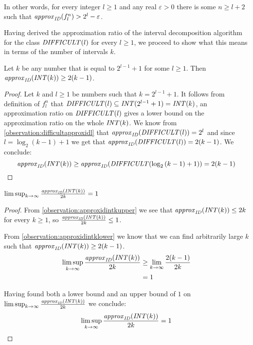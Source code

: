 In other words,
for every integer $l \geq 1$
and any real $\varepsilon > 0$
there is some $n \geq l+2$
such that $\mathit{approx}_{\mathit{ID}} (f_l^n) > 2^l - \varepsilon$.

Having derived the approximation ratio
of the interval decomposition algorithm
for the class $\mathit{DIFFICULT} (l)$ for every $l \geq 1$,
we proceed to show what this means in terms of
the number of intervals $k$.

\begin{observation}
\label{observation:approxidintklower}
Let $k$ be any number that is equal to $2^{l-1} + 1$
for some $l \geq 1$.
Then $\mathit{approx}_{\mathit{ID}} (\mathit{INT} (k)) \geq 2(k-1)$.
\end{observation}

\begin{proof}
Let $k$ and $l \geq 1$ be numbers
such that $k = 2^{l-1} + 1$.
It follows from definition of $f^n_l$ that
$\mathit{DIFFICULT} (l) \subseteq \mathit{INT} (2^{l-1}+1)
= \mathit{INT} (k)$,
an approximation ratio on $\mathit{DIFFICULT} (l)$
gives a lower bound on the approximation ratio
on the whole $\mathit{INT} (k)$.
We know from \cref{observation:difficultapproxidl} that
$\mathit{approx}_{\mathit{ID}} (\mathit{DIFFICULT} (l)) = 2^l$
and since $l = \log_2{(k-1)} + 1$ we get that
$\mathit{approx}_{\mathit{ID}} (\mathit{DIFFICULT} (l)) = 2(k-1)$.
We conclude:
$$
\mathit{approx}_{\mathit{ID}} (\mathit{INT} (k))
\geq \mathit{approx}_{\mathit{ID}} (\mathit{DIFFICULT} (\log_2{(k-1)} + 1))
= 2(k-1)
$$
\end{proof}

\begin{corollary}
$\limsup_{k \rightarrow \infty}{\frac{\mathit{approx}_{\mathit{ID}} (\mathit{INT} (k))}{2k}}
= 1$
\end{corollary}

\begin{proof}
From \cref{observation:approxidintkupper}
we see that $\mathit{approx}_{\mathit{ID}} (\mathit{INT} (k)) \leq 2k$
for every $k \geq 1$,
so $\frac{\mathit{approx}_{\mathit{ID}} (\mathit{INT} (k))}{2k} \leq 1$.

From \cref{observation:approxidintklower}
we know that we can find arbitrarily large $k$
such that $\mathit{approx}_{\mathit{ID}} (\mathit{INT} (k)) \geq 2(k-1)$.
\begin{align*}
\limsup_{k \rightarrow \infty}{\frac{\mathit{approx}_{\mathit{ID}} (\mathit{INT} (k))}{2k}}
&\geq \lim_{k \rightarrow \infty}{\frac{2(k-1)}{2k}} \\
&= 1
\end{align*}

Having found both a lower bound and an upper bound of $1$
on
$
\limsup_{k \rightarrow \infty}{\frac{\mathit{approx}_{\mathit{ID}} (\mathit{INT} (k))}{2k}}
$
we conclude:
$$
\limsup_{k \rightarrow \infty}{\frac{\mathit{approx}_{\mathit{ID}} (\mathit{INT} (k))}{2k}}
= 1
$$
\end{proof}

